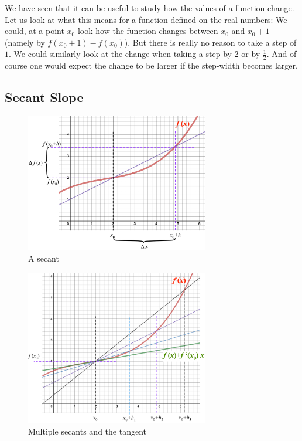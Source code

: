 We have seen that it can be useful to study how the values of a function
change. Let us look at what this means for a function defined on the real
numbers: We could, at a point $x_0$ look how the function changes between
$x_0$ and $x_0+1$ (namely by $f(x_0+1)-f(x_0)$). But there is really no
reason to take a step of $1$. We could similarly look at the change when
taking a step by $2$ or by $\frac{1}{2}$. And of course one would expect the
change to be larger if the step-width becomes larger.

\subsection{Secant Slope}

\begin{figure}
\begin{center}
\includegraphics[width=8cm]{pic/SecantSlope.pdf}
\end{center}
\caption{A secant}
\label{figonesecant}
\end{figure}

\begin{figure}
\begin{center}
\includegraphics[width=8cm]{pic/SecantSlopes.pdf}
\end{center}
\caption{Multiple secants and the tangent}
\label{figsecantslopes}
\end{figure}

